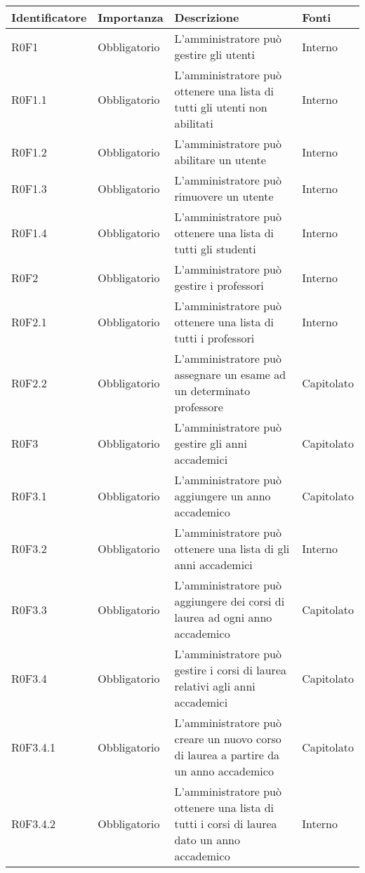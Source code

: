 \documentclass[AnalisiDeiRequisiti.tex]{subfiles}
\begin{document}
\label{table:Tabella requisiti funzionali}
\begin{longtable}[H]{|p{2.5cm}|p{2.5cm}|p{5cm}|p{2cm}|}
	\hline
	\rowcolor[HTML]{38FFF8} 
	\textbf{Identificatore} & \textbf{Importanza} & \textbf{Descrizione} & \textbf{Fonti} \\ \hline
	\endhead
	R0F1 & Obbligatorio & L'amministratore può gestire gli utenti & Interno \\ \hline
	R0F1.1 & Obbligatorio & L'amministratore può ottenere una lista di tutti gli utenti non abilitati & Interno \\ \hline
	R0F1.2 & Obbligatorio & L'amministratore può abilitare un utente & Interno \\ \hline
	R0F1.3 & Obbligatorio & L'amministratore può rimuovere un utente & Interno \\ \hline
	R0F1.4 & Obbligatorio & L'amministratore può ottenere una lista di tutti gli studenti & Interno \\ \hline
	R0F2 & Obbligatorio & L'amministratore può gestire i professori & Interno \\ \hline
	R0F2.1 & Obbligatorio & L'amministratore può ottenere una lista di tutti i professori & Interno \\ \hline
	R0F2.2 & Obbligatorio & L'amministratore può assegnare un esame ad un determinato professore & Capitolato \\ \hline
	R0F3 & Obbligatorio & L'amministratore può gestire gli anni accademici & Capitolato \\ \hline
	R0F3.1 & Obbligatorio & L'amministratore può aggiungere un anno accademico & Capitolato \\ \hline
	R0F3.2 & Obbligatorio & L'amministratore può ottenere una lista di gli anni accademici & Interno \\ \hline
	R0F3.3 & Obbligatorio & L'amministratore può aggiungere dei corsi di laurea ad ogni anno accademico & Capitolato \\ \hline
	R0F3.4 & Obbligatorio & L'amministratore può gestire i corsi di laurea relativi agli anni accademici & Capitolato \\ \hline
	R0F3.4.1 & Obbligatorio & L'amministratore può creare un nuovo corso di laurea a partire da un anno accademico & Capitolato \\ \hline
	R0F3.4.2 & Obbligatorio & L'amministratore può ottenere una lista di tutti i corsi di laurea dato un anno accademico & Interno \\ \hline

\end{longtable}
\end{document}

